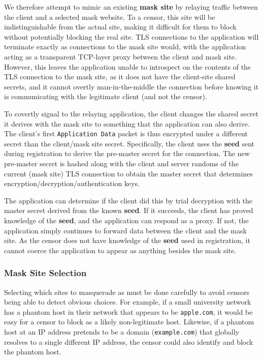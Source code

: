 \documentclass[sigconf,anonymous]{acmart}
\begin{document}
We therefore attempt to mimic an existing \textbf{mask site} by relaying
traffic between the client and a selected mask website. To a censor, this site
will be indistinguishable from the actual site, making it difficult for
them to block without potentially blocking the real site. TLS connections to the
application will terminate exactly as connections to the mask site would, with the
application acting as a transparent TCP-layer proxy between the client and mask site.
However, this leaves the application unable to introspect on the contents of the
TLS connection to the mask site, as it does not have the client-site shared
secrets, and it cannot overtly man-in-the-middle the connection before knowing
it is communicating with the legitimate client (and not the censor).


To covertly signal to the relaying application, the client changes the shared secret
it derives with the
mask site to something that the application can also derive. The client's first
\texttt{Application Data} packet is thus encrypted under a different secret than
the client/mask site secret. Specifically, the client uses the \textbf{seed}
sent during registration to derive the pre-master secret for the connection.
The new pre-master secret is hashed along with the client and server randoms of the current
(mask site) TLS connection to obtain the master secret that determines
encryption/decryption/authentication keys.

The application can determine if the client did this by trial decryption with
the master secret derived from the known \textbf{seed}. If it succeeds, the
client has proved knowledge of the \textbf{seed}, and the application can
respond as a proxy. If not, the application simply continues to forward data
between the client and the mask site. As the censor does not have knowledge of
the \textbf{seed} used in registration, it cannot coerce the application to
appear as anything besides the mask site.


\subsubsection{Mask Site Selection}

Selecting which sites to masquerade as must be done carefully to avoid censors
being able to detect obvious choices. For example, if a small university network
has a phantom host in their network that appears to be \texttt{apple.com}, it
would be easy for a censor to block as a likely non-legitimate host. Likewise,
if a phantom host at an IP address pretends to be a domain (\texttt{example.com}) that
globally resolves to a single different IP address, the censor could also
identify and block the phantom host.
\end{document}
